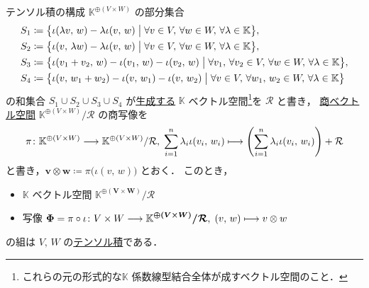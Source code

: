 \documentclass[rep_main]{subfiles}
\begin{document}
\begin{myprop}[label=prop:tensor-vec, breakable]{テンソル積の構成}
	$\mathbb{K}^{\oplus (V \times W)}$ の部分集合
	\begin{align}
		S_1 &\coloneqq \bigl\{\iota(\lambda v,\, w) - \lambda \iota(v,\, w) \bigm| \forall v \in V,\, \forall w \in W,\, \forall \lambda \in \mathbb{K} \bigr\} , \\
		S_2 &\coloneqq \bigl\{\iota(v,\, \lambda w) - \lambda \iota(v,\, w) \bigm| \forall v \in V,\, \forall w \in W,\, \forall \lambda \in \mathbb{K} \bigr\}, \\
		S_3 &\coloneqq \bigl\{\iota(v_1 + v_2,\, w) - \iota(v_1,\, w) - \iota(v_2,\, w) \bigm| \forall v_1,\, \forall v_2 \in V,\, \forall w \in W,\, \forall \lambda \in \mathbb{K} \bigr\}, \\
		S_4 &\coloneqq \bigl\{\iota(v,\, w_1 + w_2) - \iota(v,\, w_1) - \iota(v,\, w_2) \bigm| \forall v \in V,\, \forall w_1,\, w_2 \in W,\, \forall \lambda \in \mathbb{K} \bigr\}
	\end{align}
	の和集合 $S_1 \cup S_2 \cup S_3 \cup S_4$ が\hyperref[prop:gen-submodule]{生成する} $\mathbb{K}$ ベクトル空間\footnote{これらの元の形式的な$\mathbb{K}$ 係数線型結合全体が成すベクトル空間のこと．}を $\mathcal{R}$ と書き，
	\hyperref[prop:quotient-vec]{商ベクトル空間}
	$\mathbb{K}^{\oplus (V \times W)} / \mathcal{R}$ 
	の商写像を
	\begin{align}
		\pi \colon \mathbb{K}^{\oplus (V \times W)} \longrightarrow \mathbb{K}^{\oplus (V \times W)} / \mathcal{R},\; \sum_{i=1}^n \lambda_i \iota(v_i,\, w_i) \longmapsto \left( \sum_{i=1}^n \lambda_i \iota(v_i,\, w_i) \right) + \mathcal{R}
	\end{align}
	と書き，$\bm{v \otimes w} \coloneqq \pi \bigl( \iota (v,\, w) \bigr)$ とおく．
	このとき，
	\begin{itemize}
		\item $\mathbb{K}$ ベクトル空間 $\bm{\mathbb{K}^{\oplus (V \times W)} / \mathcal{R}}$
		\item 写像 $\bm{\Phi} = \pi \circ \iota \colon V \times W \longrightarrow \bm{\mathbb{K}^{\oplus (V \times W)} / \mathcal{R}},\; (v,\, w) \longmapsto v \otimes w$
	\end{itemize}
	の組は $V,\, W$ の\hyperref[def:univ-vec-tensor]{テンソル積}である．
\end{myprop}
\end{document}
